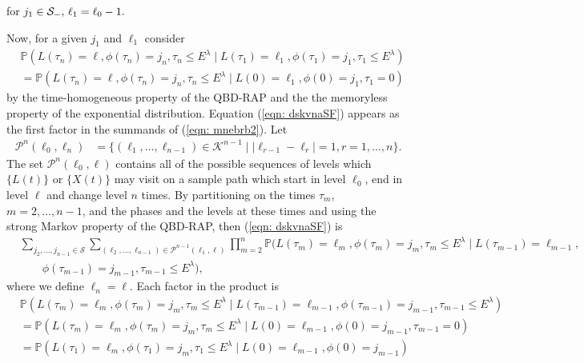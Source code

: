 for \( j_1\in\mathcal{S}_-,\, \ell_1=\ell_0-1.\)

Now, for a given \(j_1\) and \(\ell_1\) consider 
\begin{align}
	&\mathbb P(L(\tau_n) = \ell, \phi(\tau_n) = j_n, \tau_{n}\leq E^\lambda 
	 \mid L(\tau_1)=\ell_1, 
	 \phi(\tau_1)=j_1, \tau_1\leq E^\lambda) \nonumber 
	\\&=\mathbb P(L(\tau_n) = \ell, \phi(\tau_n) = j_n, \tau_{n}\leq E^\lambda 
	 \mid L(0)=\ell_1, 
	 \phi(0)=j_1, \tau_1=0)\label{eqn: dskvnaSF}
\end{align}
by the time-homogeneous property of the QBD-RAP and the the memoryless property of the exponential distribution.
Equation (\ref{eqn: dskvnaSF}) appears as the first factor in the summands of (\ref{eqn: mnebrb2}). Let 
\begin{align}\label{eqn: paths set1}
	\mathcal P^n(\ell_0,\ell_n)&=\{(\ell_1,\dots,\ell_{n-1}) \in \mathcal K^{n-1}\mid |\ell_{r-1}-\ell_r|=1,r = 1,\dots,n\}.
\end{align}
The set \(\mathcal P^n(\ell_0,\ell)\) contains all of the possible sequences of levels which \(\{L(t)\}\) or \(\{X(t)\}\) may visit on a sample path which start in level \(\ell_0\), end in level \(\ell\) and change level \(n\) times. By partitioning on the times \(\tau_m\), \(m=2,\dots,n-1\), and the phases and the levels at these times and using the strong Markov property of the QBD-RAP, then (\ref{eqn: dskvnaSF}) is  
	\begin{align}
	 &\sum_{j_2,\dots,j_{n-1}\in\mathcal S}\sum_{(\ell_2,\dots,\ell_{n-1}) \in\mathcal P^{n-1}(\ell_1,\ell)}\prod_{m=2}^{n}\mathbb P(L(\tau_m) = \ell_m, \phi(\tau_m) = j_m, \tau_{m}\leq E^\lambda 
            	 \mid L(\tau_{m-1}) = \ell_{m-1}, \nonumber
	 	 \\&\qquad\phi(\tau_{m-1}) = j_{m-1}, \tau_{m-1}\leq E^\lambda),  \label{eqn: 161222}
\end{align}
where we define \(\ell_n=\ell\). Each factor in the product is 
\begin{align}
	&\mathbb P(L(\tau_m) = \ell_m, \phi(\tau_m) = j_m, \tau_{m}\leq E^\lambda 
            	 \mid L(\tau_{m-1}) = \ell_{m-1}, \nonumber
	 	 \phi(\tau_{m-1}) = j_{m-1}, \tau_{m-1}\leq E^\lambda)
	\\&=\mathbb P(L(\tau_m) = \ell_m, \phi(\tau_m) = j_m, \tau_{m}\leq E^\lambda 
            	 \mid L(0) = \ell_{m-1}, 
	 	 \phi(0) = j_{m-1}, \tau_{m-1}=0)\nonumber
	\\&=\mathbb P(L(\tau_1) = \ell_m, \phi(\tau_1) = j_m, \tau_{1}\leq E^\lambda 
            	 \mid L(0) = \ell_{m-1}, 
	 	 \phi(0) = j_{m-1})\label{eqn: kk}
\end{align}
